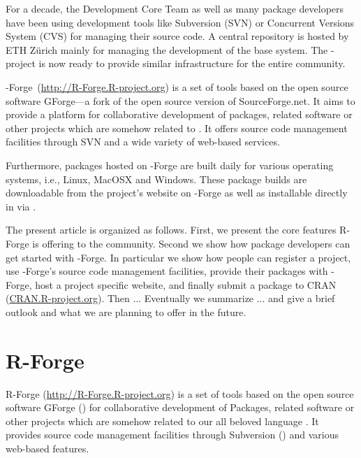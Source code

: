 For a decade, the \R Development Core Team as well as many
\R package developers have been using
development tools like Subversion (SVN) or Concurrent Versions System
(CVS) for managing their source code. 
A central repository is hosted by ETH Z\"urich mainly for
managing the development of the base \R system. The
\R-project is now ready to provide similar infrastructure
for the entire \R community.

\R-Forge~(\url{http://R-Forge.R-project.org}) is a set of tools based
on the open source software GForge---a fork of
the open source version of SourceForge.net.
It aims to provide a platform for collaborative development of
\R packages, \R 
related software or other projects which are somehow related to \R.
It offers source code management facilities through SVN and
a wide variety of web-based services.

Furthermore, packages hosted on \R-Forge are built daily
for  various operating systems, i.e., Linux, MacOSX and Windows. These
package builds are downloadable from the 
project's website on \R-Forge as well as installable 
directly in \R via .

The present article is organized as follows. First, we present the core
features R-Forge is offering to the \R community. Second we
show how package developers can get started with 
\R-Forge. In particular we show how people can register a project, 
use \R-Forge's source code management facilities, provide their
packages with \R-Forge, host a project specific website, and
finally submit a package to CRAN (\url{CRAN.R-project.org}). Then ...
Eventually we summarize ... and give a brief outlook and what we are
planning to offer in the future.


\section{R-Forge}
R-Forge (\url{http://R-Forge.R-project.org}) is a set of tools based
on the open source software GForge (\cite{manual:gforge})%
 for collaborative development of \R Packages, \R
related software or other projects which are somehow related to our
all beloved language \R. It provides source code management facilities
through Subversion (\cite{subversion07}) and various web-based features. 


